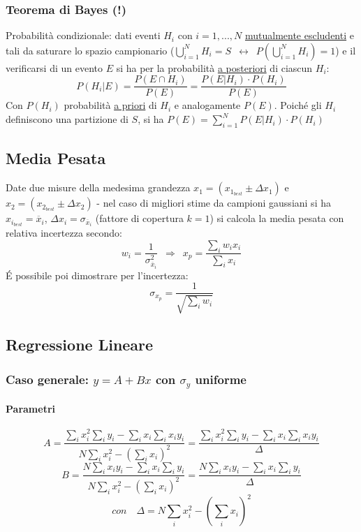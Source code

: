 \documentclass[11pt]{article}
\begin{document}
\subsubsection*{Teorema di Bayes (!)}
Probabilità condizionale: dati eventi $H_i$ con $i = 1, ..., N$ \underline{mutualmente escludenti} e tali da saturare lo spazio campionario ($\bigcup \limits_{i=1}^{N} H_i = S \enspace \leftrightarrow \enspace P(\bigcup \limits_{i=1}^{N} H_i) = 1$) e il verificarsi di un evento $E$ si ha per la probabilità \underline{a posteriori} di ciascun $H_i$:
\[P(H_i | E) = \frac{P(E \cap H_i)}{P(E)} = \frac{P(E | H_i) \cdot P(H_i)}{P(E)}\]
Con $P(H_i)$ probabilità \underline{a priori} di $H_i$ e analogamente $P(E)$. Poiché gli $H_i$ definiscono una partizione di $S$, si ha $P(E) = \sum_{i=1}^N P(E | H_i) \cdot P(H_i)$

\subsection{Media Pesata}
Date due misure della medesima grandezza $x_1 = (x_{1_{best}} \pm \Delta x_1)$ e $x_2 = (x_{2_{best}} \pm \Delta x_2)$ - nel caso di migliori stime da campioni gaussiani si ha $x_{i_{best}} = \overline{x}_i$, $\Delta x_i = \sigma_{\overline{x}_i}$ (fattore di copertura $k = 1$) si calcola la media pesata con relativa incertezza secondo:
\[w_i = \frac{1}{\sigma_{\overline{x}_i}^2} \enspace \Rightarrow \enspace x_p = \frac{\sum_i w_i x_i}{\sum_i x_i}\]
\'E possibile poi dimostrare per l'incertezza:
\[\sigma_{x_p} = \frac{1}{\sqrt{\sum_i w_i}}\]

\subsection{Regressione Lineare}
\subsubsection*{Caso generale: $y = A + Bx$ con $\sigma_y$ uniforme}
\paragraph{Parametri}
\[A = \frac{\sum_i x_i^2 \sum_i y_i - \sum_i x_i \sum_i x_i y_i}{N \sum_i x_i^2 - (\sum_i x_i)^2} = \frac{\sum_i x_i^2 \sum_i y_i - \sum_i x_i \sum_i x_i y_i}{\Delta}\] 
\[B = \frac{N \sum_i x_i y_i - \sum_i x_i \sum_i y_i}{N \sum_i x_i^2 - (\sum_i x_i)^2} = \frac{N \sum_i x_i y_i - \sum_i x_i \sum_i y_i}{\Delta}\]
\[con \quad \Delta = N \sum_i x_i^2 - (\sum_i x_i)^2\]
\end{document}
